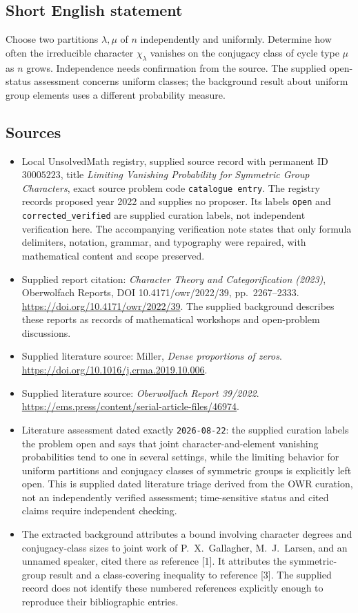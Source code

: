 \documentclass[11pt]{article}
\begin{document}
\subsection{Short English statement}
Choose two partitions \(\lambda,\mu\) of \(n\) independently and uniformly. Determine how often the irreducible character \(\chi_\lambda\) vanishes on the conjugacy class of cycle type \(\mu\) as \(n\) grows. Independence needs confirmation from the source. The supplied open-status assessment concerns uniform classes; the background result about uniform group elements uses a different probability measure.
\subsection{Sources}
\begin{itemize}
\item Local UnsolvedMath registry, supplied source record with permanent ID \(30005223\), title \emph{Limiting Vanishing Probability for Symmetric Group Characters}, exact source problem code \texttt{catalogue entry}. The registry records proposed year 2022 and supplies no proposer. Its labels \texttt{open} and \texttt{corrected\_verified} are supplied curation labels, not independent verification here. The accompanying verification note states that only formula delimiters, notation, grammar, and typography were repaired, with mathematical content and scope preserved.
\item Supplied report citation: \emph{Character Theory and Categorification (2023)}, Oberwolfach Reports, DOI 10.4171/owr/2022/39, pp.\ 2267--2333. \url{https://doi.org/10.4171/owr/2022/39}. The supplied background describes these reports as records of mathematical workshops and open-problem discussions.
\item Supplied literature source: Miller, \emph{Dense proportions of zeros}. \url{https://doi.org/10.1016/j.crma.2019.10.006}.
\item Supplied literature source: \emph{Oberwolfach Report 39/2022}. \url{https://ems.press/content/serial-article-files/46974}.
\item Literature assessment dated exactly \texttt{2026-08-22}: the supplied curation labels the problem open and says that joint character-and-element vanishing probabilities tend to one in several settings, while the limiting behavior for uniform partitions and conjugacy classes of symmetric groups is explicitly left open. This is supplied dated literature triage derived from the OWR curation, not an independently verified assessment; time-sensitive status and cited claims require independent checking.
\item The extracted background attributes a bound involving character degrees and conjugacy-class sizes to joint work of P.\ X.\ Gallagher, M.\ J.\ Larsen, and an unnamed speaker, cited there as reference [1]. It attributes the symmetric-group result and a class-covering inequality to reference [3]. The supplied record does not identify these numbered references explicitly enough to reproduce their bibliographic entries.
\end{itemize}
\end{document}
